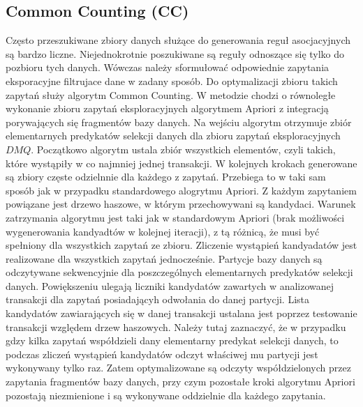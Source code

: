 \subsection{Common Counting (CC) \cite{WojciechowskiCC}}
\label{c325}
Często przeszukiwane zbiory danych służące do generowania reguł asocjacyjnych są bardzo liczne. Niejednokrotnie poszukiwane są reguły odnoszące się tylko do pozbioru tych danych. Wówczas należy sformułować odpowiednie zapytania eksporacyjne filtrujace dane w zadany sposób. Do optymalizacji zbioru takich zapytań służy algorytm Common Counting. W metodzie chodzi o równoległe wykonanie zbioru zapytań eksploracyjnych algorytmem Apriori z integracją porywających się fragmentów bazy danych. Na wejściu algorytm otrzymuje zbiór elementarnych predykatów selekcji danych dla zbioru zapytań eksploracyjnych \(DMQ\). Początkowo algorytm ustala zbiór wszystkich elementów, czyli takich, które wystąpiły w co najmniej jednej transakcji. W kolejnych krokach generowane są zbiory częste odzielnnie dla każdego z zapytań. Przebiega to w taki sam sposób jak w przypadku standardowego alogrytmu Apriori. Z każdym zapytaniem powiązane jest drzewo haszowe, w którym przechowywani są kandydaci. Warunek zatrzymania algorytmu jest taki jak w standardowym Apriori (brak możliwości wygenerowania kandyadtów w kolejnej iteracji), z tą różnicą, że musi być spełniony dla wszystkich zapytań ze zbioru. 
Zliczenie wystąpień kandyadatów jest realizowane dla wszystkich zapytań jednocześnie. Partycje bazy danych są odczytywane sekwencyjnie dla poszczególnych elementarnych predykatów selekcji danych. Powiększeniu ulegają liczniki kandydatów zawartych w analizowanej transakcji dla zapytań posiadającyh odwołania do danej partycji. Lista kandydatów zawiarających się w danej transakcji ustalana jest poprzez testowanie transakcji względem drzew haszowych. Należy tutaj zaznaczyć, że w przypadku gdzy kilka zapytań współdzieli dany elementarny predykat selekcji danych, to podczas zliczeń wystąpień kandydatów odczyt właściwej mu partycji jest wykonywany tylko raz. Zatem optymalizowane są odczyty współdzielonych przez zapytania fragmentów bazy danych, przy czym pozostałe kroki algorytmu Apriori pozostają niezmienione i są wykonywane oddzielnie dla każdego zapytania. 

